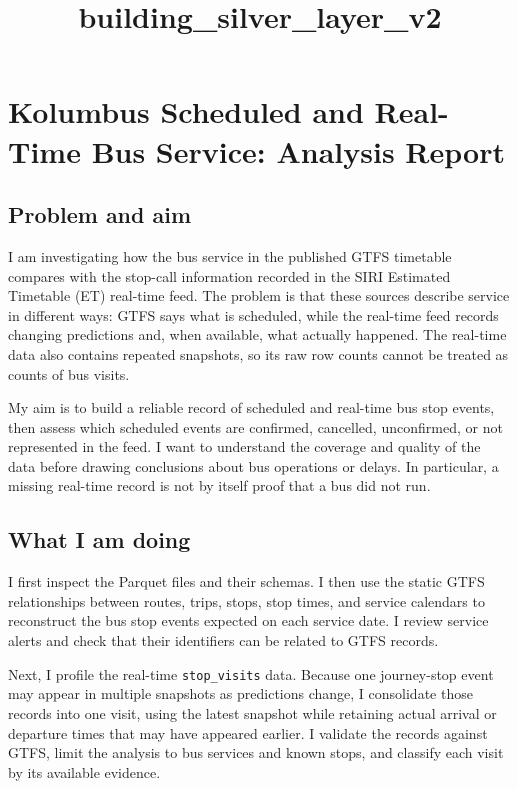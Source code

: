 \documentclass[11pt]{article}
\title{building\_silver\_layer\_v2}
\begin{document}
    
    \maketitle
    
    

    
    \section{Kolumbus Scheduled and Real-Time Bus Service: Analysis
Report}\label{kolumbus-scheduled-and-real-time-bus-service-analysis-report}

\subsection{Problem and aim}\label{problem-and-aim}

I am investigating how the bus service in the published GTFS timetable
compares with the stop-call information recorded in the SIRI Estimated
Timetable (ET) real-time feed. The problem is that these sources
describe service in different ways: GTFS says what is scheduled, while
the real-time feed records changing predictions and, when available,
what actually happened. The real-time data also contains repeated
snapshots, so its raw row counts cannot be treated as counts of bus
visits.

My aim is to build a reliable record of scheduled and real-time bus stop
events, then assess which scheduled events are confirmed, cancelled,
unconfirmed, or not represented in the feed. I want to understand the
coverage and quality of the data before drawing conclusions about bus
operations or delays. In particular, a missing real-time record is not
by itself proof that a bus did not run.

\subsection{What I am doing}\label{what-i-am-doing}

I first inspect the Parquet files and their schemas. I then use the
static GTFS relationships between routes, trips, stops, stop times, and
service calendars to reconstruct the bus stop events expected on each
service date. I review service alerts and check that their identifiers
can be related to GTFS records.

Next, I profile the real-time \texttt{stop\_visits} data. Because one
journey-stop event may appear in multiple snapshots as predictions
change, I consolidate those records into one visit, using the latest
snapshot while retaining actual arrival or departure times that may have
appeared earlier. I validate the records against GTFS, limit the
analysis to bus services and known stops, and classify each visit by its
available evidence.
\end{document}
